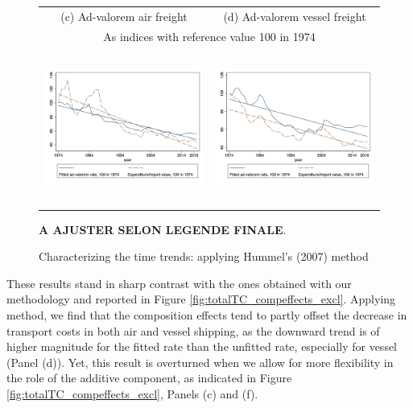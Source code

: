 \documentclass[a4paper,11pt]{article}
\begin{document}
\begin{figure}[htbp]
\caption{Characterizing the time trends: applying Hummel's (2007) method }
\label{fig:comp_effects_as_in_Hummels}
\begin{center}
\begin{tabular}{cc}
{\small (c) Ad-valorem air freight} & {\small (d) Ad-valorem vessel freight}\\
\multicolumn{2}{c}{{\small As indices with reference value 100 in 1974} }\\
\includegraphics[width=2.5in, height=2in]{figure5_comme_hummels_base100.jpg}
& \includegraphics[width=2.5in,height=2in]{figure6_comme_hummels_base100.jpg} \\
\end{tabular}
	\begin{minipage}  [c]  {6in}
		\scriptsize
\textbf{A AJUSTER SELON LEGENDE FINALE}.
\end{minipage}
\end{center}
\end{figure}

These results stand in sharp contrast with the ones obtained with our methodology and reported in Figure \ref{fig:totalTC_compeffects_excl}.
Applying \cite{hummels2007} method, we find that the composition effects tend to partly offset the decrease in transport costs in both air and vessel shipping, as the downward trend is of higher magnitude for the fitted rate than the unfitted rate, especially for vessel (Panel (d)). Yet, this result is overturned when we allow for more flexibility in the role of the additive component, as indicated in Figure \ref{fig:totalTC_compeffects_excl}, Panels (c) and (f).\medskip
\end{document}
